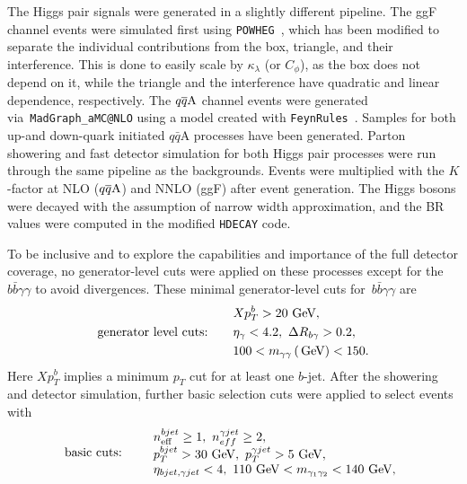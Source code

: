 \par The Higgs pair signals were generated in a slightly different pipeline. The ggF channel events were simulated first using \texttt{POWHEG}~\cite{Heinrich:2017kxx,Heinrich:2019bkc,Heinrich:2020ckp}, which has been modified to separate the individual contributions from the box, triangle, and their interference.  This is done to easily scale by $\kappa_\lambda$ (or $C_\phi$), as the box does not depend on it, while the triangle and the interference have quadratic and linear dependence, respectively. The $q\overline q \rm A$ channel events were generated via~\texttt{MadGraph\_aMC@NLO} using a model created with \texttt{FeynRules}~\cite{Alloul:2013bka}. Samples for both up-and down-quark initiated $q\bar q$A processes have been generated. Parton showering and fast detector simulation for both Higgs pair processes were run through the same pipeline as the backgrounds. Events were multiplied with the $K$-factor at NLO ($q\overline q \rm A$) and NNLO (ggF) after event generation. The Higgs bosons were decayed with the assumption of narrow width approximation, and the BR values were computed in the modified \texttt{HDECAY} code. 
\par To be inclusive and to explore the capabilities and importance of the full detector coverage, no generator-level cuts were applied on these processes except for the $b\bar b \gamma\gamma$  to avoid divergences. These minimal generator-level cuts for~$b\bar b\gamma\gamma$ are
\begin{equation}
	\begin{aligned}
		& Xp_T^b>20\,\,\textrm{GeV}, \\
		\textrm{generator level cuts:}\qquad& \eta_\gamma<4.2,~ \Delta R_{b\gamma}>0.2, \\
		& 100< m_{\gamma\gamma} \,(\,\textrm{GeV}) < 150.
	\end{aligned}
\end{equation}
Here $Xp_T^b$ implies a minimum $p_T$ cut for at least one $b$-jet. 
After the showering and detector simulation, further basic selection cuts were applied to select events with
\begin{equation}
	\textrm{basic cuts:}\qquad
	\begin{array}{l}
		n_{\mathrm{eff}}^{bjet}\geq 1,~n_{eff}^{\gamma jet} \geq 2,\\
		p_T^{bjet}>30\,\,\textrm{GeV},~p_T^{\gamma jet}>5\,\,\textrm{GeV},\\
		\eta_{bjet,\gamma jet}<4,~ 110\, \,\textrm{GeV} < m_{\gamma_1\gamma_2} < 140\,\,\textrm{GeV},
	\end{array}
	\label{eqn:bcuts}
\end{equation}

